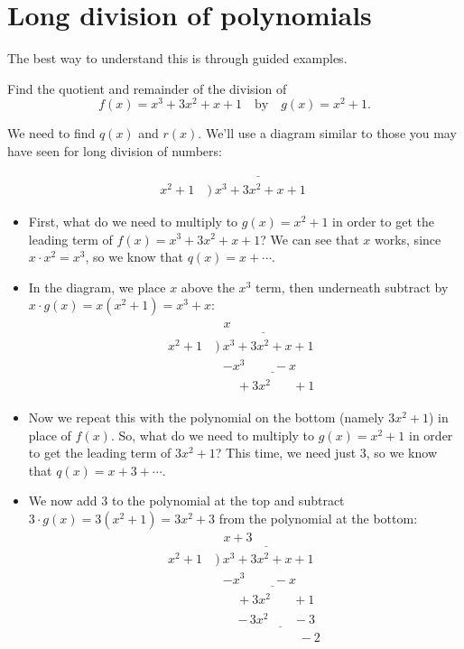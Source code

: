 \documentclass{ximera}
\begin{document}
\section{Long division of polynomials}

The best way to understand this is through guided examples.

\begin{example}
  Find the quotient and remainder of the division of $$f(x) = x^3+3x^2+x+1\quad\mbox{by}\quad g(x) = x^2+1.$$
  
  \begin{explanation}
    We need to find $q(x)$ and $r(x)$. We'll use a diagram similar to those you may have seen for long division of numbers: \begin{align*}
   & \underline{~~~\phantom{x+3}\phantom{somethings}} \\[-4pt]  x^2+1~&\Big)~ x^3+3x^2+x+1 
\end{align*}
    
    \begin{itemize}
    \item First, what do we need to multiply to $g(x) = x^2+1$ in order to get the leading term of $f(x) = x^3+3x^2+x+1$? We can see that $x$ works, since $x \cdot x^2 = x^3$, so we know that $q(x) = x + \cdots$. 
    
    \item In the diagram, we place $x$ above the $x^3$ term, then underneath subtract by $x \cdot g(x) = x(x^2+1) = x^3 + x$:\begin{align*}
   & \underline{~~~x\phantom{+3}\phantom{somethings}} \\[-4pt]  x^2+1~&\Big)~ x^3+3x^2+x+1 \\[-4pt] &\phantom{\big)~} \underline{-x^3\phantom{+3x^2}\!-x\phantom{+1...}} \\[-4pt] &\phantom{\Big)~}\phantom{0n\!}+3x^2\phantom{+0~}~+1
\end{align*}
    \item Now we repeat this with the polynomial on the bottom (namely $3x^2 + 1$) in place of $f(x)$. So, what do we need to multiply to $g(x) = x^2+1$ in order to get the leading term of $3x^2+1$? This time, we need just $3$, so we know that $q(x) = x + 3 + \cdots$. 
    
    \item We now add $3$ to the polynomial at the top and subtract $3 \cdot g(x) = 3(x^2+1) = 3x^2 + 3$ from the polynomial at the bottom:
    \begin{align*}
   & \underline{~~~x+3\phantom{somethings}} \\[-4pt]  x^2+1~&\Big)~ x^3+3x^2+x+1 \\[-4pt] &\phantom{\big)~} \underline{-x^3\phantom{+3x^2}\!-x\phantom{+1...}} \\[-4pt] &\phantom{\Big)~}\phantom{0n\!}+3x^2\phantom{+0~}~+1 \\[-4pt] &\phantom{\big)~} \phantom{nn}\underline{-\,3x^2\phantom{+xn}-3\phantom{n}} \\ &\phantom{nnnnnnnnnnn}-2
\end{align*}
    

\end{itemize}
\end{explanation}
\end{example}
\end{document}
